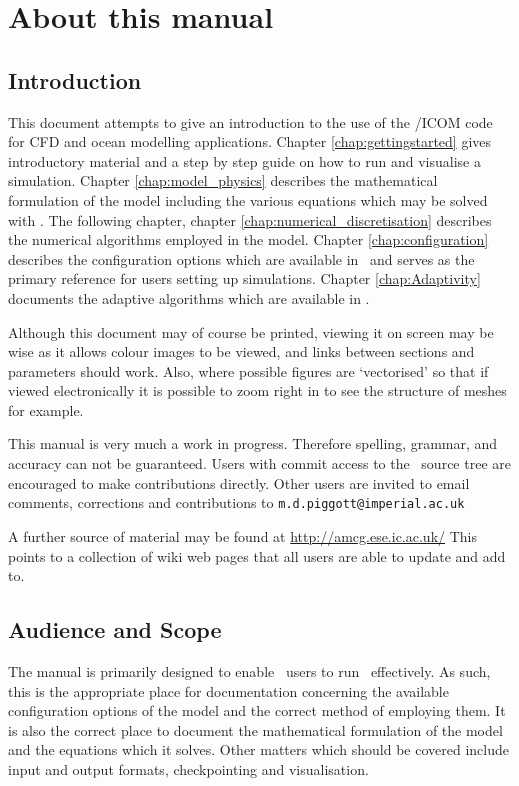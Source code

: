 \chapter{About this manual}

\section{Introduction}

This document attempts to give an introduction to the use of the
\fluidity/ICOM code for CFD and ocean modelling applications.  Chapter \ref{chap:gettingstarted}
gives introductory material and a step by step guide on how to run and
visualise a simulation.  Chapter \ref{chap:model_physics} describes the
mathematical formulation of the model including the various equations which
may be solved with \fluidity. The following chapter, chapter
\ref{chap:numerical_discretisation} describes the numerical algorithms
employed in the model. Chapter
\ref{chap:configuration} describes the configuration options which are
available in \fluidity\ and serves as the primary reference for users setting
up simulations. Chapter \ref{chap:Adaptivity} documents the adaptive
algorithms which are available in \fluidity.

Although this document may of course be printed, viewing it on screen may be
wise as it allows colour images to be viewed, and links between sections and
parameters should work. Also, where possible figures are `vectorised' so
that if viewed electronically it is possible to zoom right in to see the
structure of meshes for example.

This manual is very much a work in progress. Therefore spelling, grammar,
and accuracy can not be guaranteed. Users with commit access to the \fluidity\
source tree are encouraged to make contributions directly. Other users are
invited to email comments, corrections and contributions to
\verb|m.d.piggott@imperial.ac.uk|

A further source of material may be found at \url{http://amcg.ese.ic.ac.uk/}
This points to a collection of wiki web pages that all users are able to
update and add to. 

\section{Audience and Scope}

The manual is primarily designed to enable \fluidity\ users to run \fluidity\
effectively. As such, this is the appropriate place for documentation
concerning the available configuration options of the model and the correct
method of employing them. It is also the correct place to document the
mathematical formulation of the model and the equations which it
solves. Other matters which should be covered include input and output
formats, checkpointing and visualisation.

